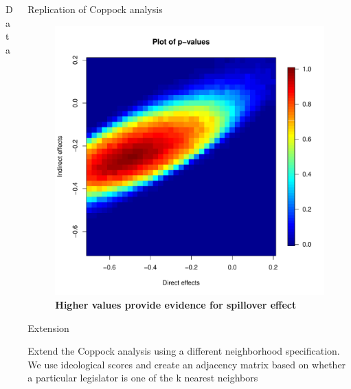 \documentclass[final]{beamer}
\newlength{\onecolwid}
\newlength{\onecolwidd}
\begin{document}
\begin{frame}[t]
\begin{columns}[t]
\begin{column}{\onecolwidd}
\begin{block}{Data}
\begin{rmfamily}
	\end{rmfamily}						
	\end{block}
	
	\end{column}



\begin{column}{\onecolwidd}

	\begin{block}{Replication of Coppock analysis}
	\begin{rmfamily}
	
	\vspace{-8mm}
	\begin{figure}
	\centering
	\includegraphics[scale=1]{pvalues_figure.pdf}
	\caption{\textbf{Higher values provide evidence for spillover effect}}
	\end{figure}

	\end{rmfamily}						
	\end{block}


	\vspace*{10mm}
	\begin{block}{Extension}
	\begin{rmfamily}
	
	Extend the Coppock analysis using a different neighborhood specification. We use ideological scores and create an adjacency matrix based on whether a particular legislator is one of the k nearest neighbors
	

\end{rmfamily}
\end{block}
\end{column}
\end{columns}
\end{frame}
\end{document}
